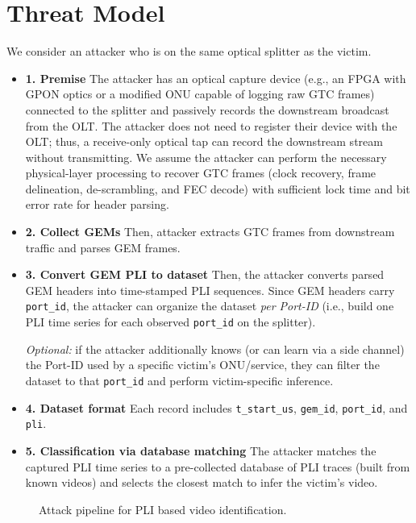 \documentclass[sigconf,anonymous]{acmart}
\begin{document}
\section{Threat Model}
We consider an attacker who is on the same optical splitter as the victim.
\begin{itemize}
  \item \textbf{1. Premise} The attacker has an optical capture device (e.g., an FPGA with GPON optics or a modified ONU capable of logging raw GTC frames) connected to the splitter and passively records the downstream broadcast from the OLT.
The attacker does not need to register their device with the OLT; thus, a receive-only optical tap can record the downstream stream without transmitting.
We assume the attacker can perform the necessary physical-layer processing to recover GTC frames (clock recovery, frame delineation, de-scrambling, and FEC decode) with sufficient lock time and bit error rate for header parsing.
  \item \textbf{2. Collect GEMs} Then, attacker extracts GTC frames from downstream traffic and parses GEM frames. 
  \item \textbf{3. Convert GEM PLI to dataset} Then, the attacker converts parsed GEM headers into time-stamped PLI sequences.
  Since GEM headers carry \texttt{port\_id}, the attacker can organize the dataset \emph{per Port-ID} (i.e., build one PLI time series for each observed \texttt{port\_id} on the splitter).

  \emph{Optional:} if the attacker additionally knows (or can learn via a side channel) the Port-ID used by a specific victim's ONU/service, they can filter the dataset to that \texttt{port\_id} and perform victim-specific inference.
  \item \textbf{4. Dataset format} Each record includes \texttt{t\_start\_us}, \texttt{gem\_id}, \texttt{port\_id}, and \texttt{pli}.
  \item \textbf{5. Classification via database matching} The attacker matches the captured PLI time series to a pre-collected database of PLI traces (built from known videos) and selects the closest match to infer the victim’s video.
\end{itemize}
\begin{figure}[h]
  \centering
  \vspace{-0.2em}
  
  \caption{Attack pipeline for PLI based video identification.}
  \label{fig:pipeline}
\end{figure}
\end{document}
